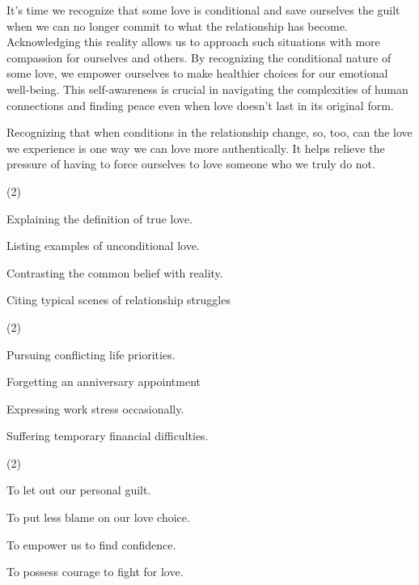 \documentclass{英语试卷}
\begin{document}
\par It's time we recognize that some love is conditional and save ourselves the guilt when we can no longer commit to what the relationship has become. Acknowledging this reality allows us to approach such situations with more compassion for ourselves and others. By recognizing the conditional nature of some love, we empower ourselves to make healthier choices for our emotional well-being. This self-awareness is crucial in navigating the complexities of human connections and finding peace even when love doesn't last in its original form.\par
\par Recognizing that when conditions in the relationship change, so, too, can the love we experience is one way we can love more authentically. It helps relieve the pressure of having to force ourselves to love someone who we truly do not.\par
{}
\begin{choices}(2)
  \item Explaining the definition of true love.
  \item Listing examples of unconditional love.
  \item Contrasting the common belief with reality.
  \item Citing typical scenes of relationship struggles
\end{choices}
\begin{choices}(2)
  \item Pursuing conflicting life priorities.
  \item Forgetting an anniversary appointment
  \item Expressing work stress occasionally.
  \item Suffering temporary financial difficulties.
\end{choices}
\begin{choices}(2)
  \item To let out our personal guilt.
  \item To put less blame on our love choice.
  \item To empower us to find confidence.
  \item To possess courage to fight for love.
\end{choices}
\end{document}
